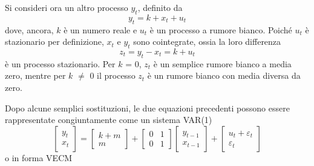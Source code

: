 Si consideri ora un altro processo $y_t$, definito da
%      
\[ y_t = k + x_t + u_t \] 
%
dove, ancora, $k$ è un numero reale e $u_t$ è un processo a rumore bianco.
Poiché $u_t$ è stazionario per definizione, $x_t$ e $y_t$ sono
cointegrate, ossia la loro differenza
%      
\[ z_t = y_t - x_t = k + u_t \]
%	
è un processo stazionario. Per $k$ = 0, $z_t$ è un semplice rumore bianco
a media zero, mentre per $k$ $\ne$ 0 il processo $z_t$ è un rumore bianco
con media diversa da zero.
  
Dopo alcune semplici sostituzioni, le due equazioni precedenti possono
essere rappresentate congiuntamente come un sistema VAR(1)
%      
\[ \left[ \begin{array}{c} y_t \\ x_t \end{array} \right] = \left[
  \begin{array}{c} k + m \\ m \end{array} \right] + \left[
  \begin{array}{rr} 0 & 1 \\ 0 & 1 \end{array} \right] \left[
  \begin{array}{c} y_{t-1} \\ x_{t-1} \end{array} \right] + \left[
  \begin{array}{c} u_t + \varepsilon_t \\ \varepsilon_t \end{array}
\right] \]
%	
o in forma VECM
%      

